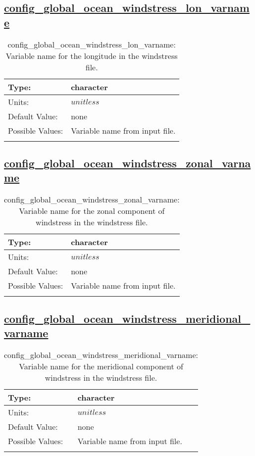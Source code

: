 \subsection[config\_global\_ocean\_windstress\_lon\_varname]{\hyperref[sec:nm_tab_global_ocean]{config\_global\_ocean\_windstress\_lon\_varname}}
\label{subsec:nm_sec_config_global_ocean_windstress_lon_varname}
\begin{center}
\begin{longtable}{| p{2.0in} || p{4.0in} |}
    \hline
    Type: & character \\
    \hline
    Units: & $unitless$ \\
    \hline
    Default Value: & none \\
    \hline
    Possible Values: & Variable name from input file. \\
    \hline
    \caption{config\_global\_ocean\_windstress\_lon\_varname: Variable name for the longitude in the windstress file.}
\end{longtable}
\end{center}
\subsection[config\_global\_ocean\_windstress\_zonal\_varname]{\hyperref[sec:nm_tab_global_ocean]{config\_global\_ocean\_windstress\_zonal\_varname}}
\label{subsec:nm_sec_config_global_ocean_windstress_zonal_varname}
\begin{center}
\begin{longtable}{| p{2.0in} || p{4.0in} |}
    \hline
    Type: & character \\
    \hline
    Units: & $unitless$ \\
    \hline
    Default Value: & none \\
    \hline
    Possible Values: & Variable name from input file. \\
    \hline
    \caption{config\_global\_ocean\_windstress\_zonal\_varname: Variable name for the zonal component of windstress in the windstress file.}
\end{longtable}
\end{center}
\subsection[config\_global\_ocean\_windstress\_meridional\_varname]{\hyperref[sec:nm_tab_global_ocean]{config\_global\_ocean\_windstress\_meridional\_varname}}
\label{subsec:nm_sec_config_global_ocean_windstress_meridional_varname}
\begin{center}
\begin{longtable}{| p{2.0in} || p{4.0in} |}
    \hline
    Type: & character \\
    \hline
    Units: & $unitless$ \\
    \hline
    Default Value: & none \\
    \hline
    Possible Values: & Variable name from input file. \\
    \hline
    \caption{config\_global\_ocean\_windstress\_meridional\_varname: Variable name for the meridional component of windstress in the windstress file.}
\end{longtable}
\end{center}

